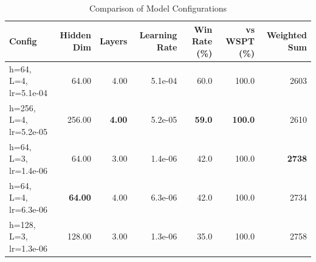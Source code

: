 \begin{table}[htbp]%
\centering%
\begin{tabular}{lrrrrrr}%
\toprule%
\textbf{Config}&\textbf{Hidden Dim}&\textbf{Layers}&\textbf{Learning Rate}&\textbf{Win Rate (\%)}&\textbf{vs WSPT (\%)}&\textbf{Weighted Sum}\\%
\midrule%
h=64, L=4, lr=5.1e-04&64.00&4.00&5.1e-04&60.0&100.0&2603\\%
h=256, L=4, lr=5.2e-05&256.00&\textbf{4.00}&5.2e-05&\textbf{59.0}&\textbf{100.0}&2610\\%
h=64, L=3, lr=1.4e-06&64.00&3.00&1.4e-06&42.0&100.0&\textbf{2738}\\%
h=64, L=4, lr=6.3e-06&\textbf{64.00}&4.00&6.3e-06&42.0&100.0&2734\\%
h=128, L=3, lr=1.3e-06&128.00&3.00&1.3e-06&35.0&100.0&2758\\%
\bottomrule%
\end{tabular}%
\caption{Comparison of Model Configurations}%
\label{tab:models}%
\end{table}